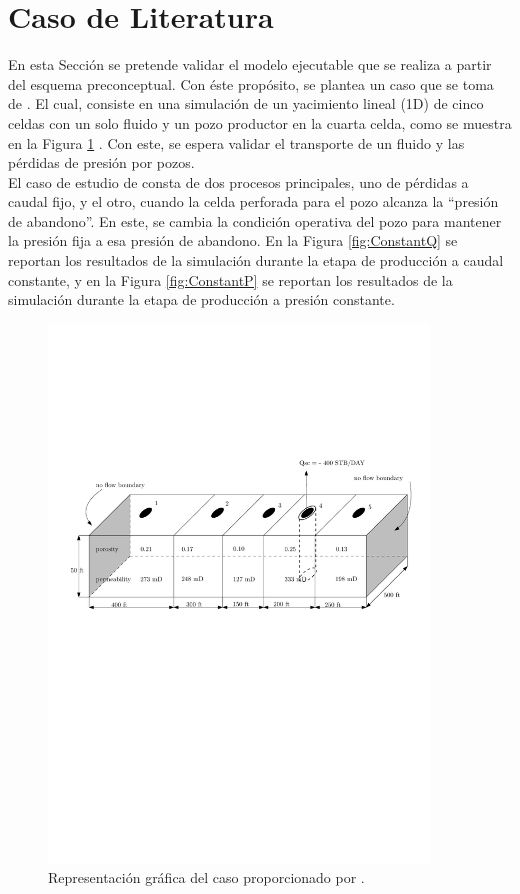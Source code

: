 \section{Caso de Literatura}
En esta Sección se pretende validar el modelo ejecutable que se realiza a partir del esquema preconceptual. Con éste propósito, se plantea un caso que se toma de \cite{jamal2006petroleum}. El cual, consiste en una simulación de un yacimiento lineal (1D) de cinco celdas con un solo fluido y un pozo productor en la cuarta celda, como se muestra en la Figura \ref{fig:Abou-Kassem} \citep{jamal2006petroleum}. Con este, se espera validar el transporte de un fluido y las pérdidas de presión por pozos.\\

El caso de estudio de \cite{jamal2006petroleum} consta de dos procesos principales, uno de pérdidas a caudal fijo, y el otro, cuando la celda perforada para el pozo alcanza la ``presión de abandono''. En este, se cambia la condición operativa del pozo para mantener la presión fija a esa presión de abandono. En la Figura \ref{fig:ConstantQ} se reportan los resultados de la simulación durante la etapa de producción a caudal constante, y en la Figura \ref{fig:ConstantP} se reportan los resultados de la simulación durante la etapa de producción a presión constante.
\begin{figure}[h]
	\centering
	\includegraphics[width=0.9\textwidth]{Fig/casoasis.pdf}
	\caption{Representación gráfica del caso proporcionado por \cite{jamal2006petroleum}.}
	\label{fig:Abou-Kassem}
\end{figure}



